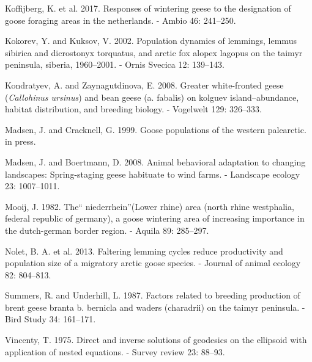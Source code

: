 \documentclass[twocolumn]{article}
\begin{document}
\hypertarget{ref-Koffijberg2017}{}
Koffijberg, K. et al. 2017. Responses of wintering geese to the
designation of goose foraging areas in the netherlands. - Ambio 46:
241--250.

\hypertarget{ref-kokorev2002population}{}
Kokorev, Y. and Kuksov, V. 2002. Population dynamics of lemmings, lemmus
sibirica and dicrostonyx torquatus, and arctic fox alopex lagopus on the
taimyr peninsula, siberia, 1960--2001. - Ornis Svecica 12: 139--143.

\hypertarget{ref-kondratyev2008greater}{}
Kondratyev, A. and Zaynagutdinova, E. 2008. Greater white-fronted geese
(\emph{Callohinus ursinus}) and bean geese (a. fabalis) on kolguev
island--abundance, habitat distribution, and breeding biology. -
Vogelwelt 129: 326--333.

\hypertarget{ref-madsen1999goose}{}
Madsen, J. and Cracknell, G. 1999. Goose populations of the western
palearctic. in press.

\hypertarget{ref-madsen2008animal}{}
Madsen, J. and Boertmann, D. 2008. Animal behavioral adaptation to
changing landscapes: Spring-staging geese habituate to wind farms. -
Landscape ecology 23: 1007--1011.

\hypertarget{ref-mooij1982niederrhein}{}
Mooij, J. 1982. The`` niederrhein''(Lower rhine) area (north rhine
westphalia, federal republic of germany), a goose wintering area of
increasing importance in the dutch-german border region. - Aquila 89:
285--297.

\hypertarget{ref-nolet2013faltering}{}
Nolet, B. A. et al. 2013. Faltering lemming cycles reduce productivity
and population size of a migratory arctic goose species. - Journal of
animal ecology 82: 804--813.

\hypertarget{ref-summers1987factors}{}
Summers, R. and Underhill, L. 1987. Factors related to breeding
production of brent geese branta b. bernicla and waders (charadrii) on
the taimyr peninsula. - Bird Study 34: 161--171.

\hypertarget{ref-vincenty1975direct}{}
Vincenty, T. 1975. Direct and inverse solutions of geodesics on the
ellipsoid with application of nested equations. - Survey review 23:
88--93.
\end{document}

